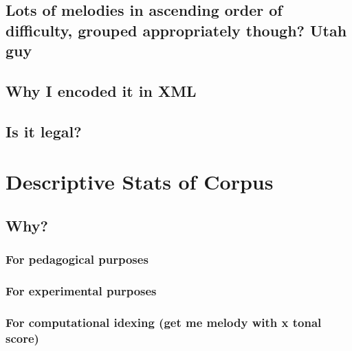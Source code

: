 \documentclass[]{book}
\begin{document}
\hypertarget{lots-of-melodies-in-ascending-order-of-difficulty-grouped-appropriately-though-utah-guy}{%
\subsection{Lots of melodies in ascending order of difficulty, grouped appropriately though? Utah guy}\label{lots-of-melodies-in-ascending-order-of-difficulty-grouped-appropriately-though-utah-guy}}

\hypertarget{why-i-encoded-it-in-xml}{%
\subsection{Why I encoded it in XML}\label{why-i-encoded-it-in-xml}}

\hypertarget{is-it-legal}{%
\subsection{Is it legal?}\label{is-it-legal}}

\hypertarget{descriptive-stats-of-corpus}{%
\section{Descriptive Stats of Corpus}\label{descriptive-stats-of-corpus}}

\hypertarget{why}{%
\subsection{Why?}\label{why}}

\hypertarget{for-pedagogical-purposes}{%
\subsubsection{For pedagogical purposes}\label{for-pedagogical-purposes}}

\hypertarget{for-experimental-purposes}{%
\subsubsection{For experimental purposes}\label{for-experimental-purposes}}

\hypertarget{for-computational-idexing-get-me-melody-with-x-tonal-score}{%
\subsubsection{For computational idexing (get me melody with x tonal score)}\label{for-computational-idexing-get-me-melody-with-x-tonal-score}}
\end{document}
